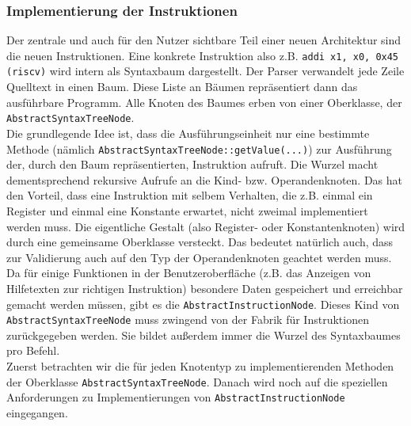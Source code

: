 \subsubsection{Implementierung der Instruktionen}
\label{extension-arch-ast}
Der zentrale und auch für den Nutzer sichtbare Teil einer neuen Architektur sind die neuen Instruktionen. Eine konkrete Instruktion also z.B. \texttt{addi x1, x0, 0x45 (riscv)} wird intern als Syntaxbaum dargestellt. Der Parser verwandelt jede Zeile Quelltext in einen Baum. Diese Liste an Bäumen repräsentiert dann das ausführbare Programm. Alle Knoten des Baumes erben von einer Oberklasse, der \texttt{AbstractSyntaxTreeNode}.\\
Die grundlegende Idee ist, dass die Ausführungseinheit nur eine bestimmte Methode (nämlich \texttt{AbstractSyntaxTreeNode::getValue(...)}) zur Ausführung der, durch den Baum repräsentierten, Instruktion aufruft. Die Wurzel macht dementsprechend rekursive Aufrufe an die Kind- bzw. Operandenknoten. Das hat den Vorteil, dass eine Instruktion mit selbem Verhalten, die z.B. einmal ein Register und einmal eine Konstante erwartet, nicht zweimal implementiert werden muss. Die eigentliche Gestalt (also Register- oder Konstantenknoten) wird durch eine gemeinsame Oberklasse versteckt. Das bedeutet natürlich auch, dass zur Validierung auch auf den Typ der Operandenknoten geachtet werden muss.\\

Da für einige Funktionen in der Benutzeroberfläche (z.B. das Anzeigen von Hilfetexten zur richtigen Instruktion) besondere Daten gespeichert und erreichbar gemacht werden müssen, gibt es die \texttt{AbstractInstructionNode}. Dieses Kind von \texttt{AbstractSyntaxTreeNode} muss zwingend von der Fabrik für Instruktionen zurückgegeben werden. Sie bildet außerdem immer die Wurzel des Syntaxbaumes pro Befehl.\\

Zuerst betrachten wir die für jeden Knotentyp zu implementierenden Methoden der Oberklasse \texttt{AbstractSyntaxTreeNode}. Danach wird noch auf die speziellen Anforderungen zu Implementierungen von \texttt{AbstractInstructionNode} eingegangen.

